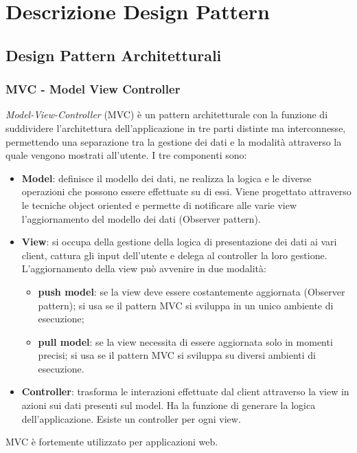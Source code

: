 \section{Descrizione Design Pattern} \label{app:design_pattern}

\subsection{Design Pattern Architetturali}

\subsubsection{MVC - Model View Controller}
\textit{Model-View-Controller} (MVC) è un pattern architetturale con la funzione di suddividere l'architettura dell'applicazione in tre parti distinte ma interconnesse, permettendo una separazione tra la gestione dei dati e la modalità attraverso la quale vengono mostrati all'utente.
I tre componenti sono:
\begin{itemize}
	\item \textbf{Model}: definisce il modello dei dati, ne realizza la logica e le diverse operazioni che possono essere effettuate su di essi. Viene progettato attraverso le tecniche object oriented e permette di notificare alle varie view l'aggiornamento del modello dei dati (Observer pattern).
	\item \textbf{View}: si occupa della gestione della logica di presentazione dei dati ai vari client, cattura gli input dell'utente e delega al controller la loro gestione. L'aggiornamento della view può avvenire in due modalità:
	\begin{itemize}
		\item \textbf{push model}: se la view deve essere costantemente aggiornata (Observer pattern); si usa se il pattern MVC si sviluppa in un unico ambiente di esecuzione;
		\item \textbf{pull model}: se la view necessita di essere aggiornata solo in momenti precisi; si usa se il pattern MVC si sviluppa su diversi ambienti di esecuzione.
	\end{itemize}
	\item \textbf{Controller}: trasforma le interazioni effettuate dal client attraverso la view in azioni sui dati presenti sul model. Ha la funzione di generare la logica dell'applicazione. Esiste un controller per ogni view.
\end{itemize}
MVC è fortemente utilizzato per applicazioni web.

